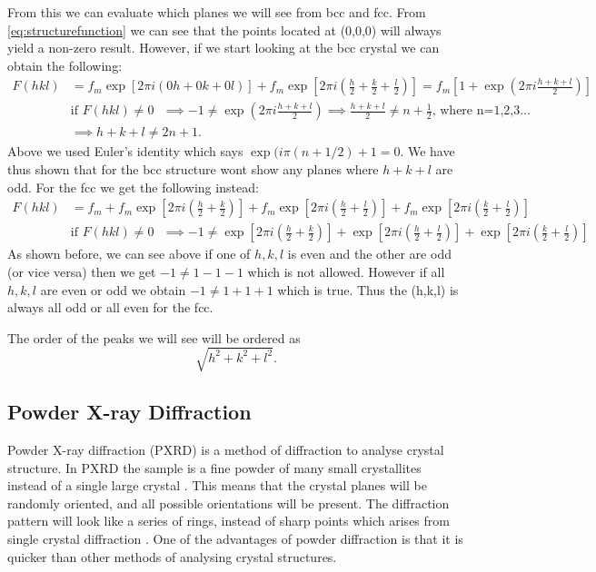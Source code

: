 From this we can evaluate which planes we will see from bcc and fcc. From \autoref{eq:structurefunction} we can see that the points located at (0,0,0) will always yield a non-zero result. However, if we start looking at the bcc crystal we can obtain the following:
\begin{align}
    F(hkl) &= f_m \exp\left[ 2\pi i \left(0{h}+0{k}+0{l}\right) \right]+ f_m \exp\left[ 2\pi i \left(\frac{h}{2} + \frac{k}{2} + \frac{l}{2}\right) \right]=f_m\left[1+ \exp\left( 2\pi i \frac{h+k+l}{2} \right)\right] \\
    &\text{if $F(hkl)\neq0$ } \implies -1\neq \exp\left( 2\pi i \frac{h+k+l}{2} \right) \implies \frac{h+k+l}{2} \neq n+\frac{1}{2} \text{, where n=1,2,3...} \\
    &\implies h+k+l\neq 2n+1.
\end{align}
Above we used Euler's identity which says $\exp(i\pi (n+1/2)+1=0$. We have thus shown that for the bcc structure wont show any planes where $h+k+l$ are odd. For the fcc we get the following instead:
\begin{align}
    F(hkl) &= f_m + f_m \exp\left[ 2\pi i \left(\frac{h}{2} + \frac{k}{2}\right) \right]+f_m \exp\left[ 2\pi i \left(\frac{h}{2} + \frac{l}{2}\right) \right]+f_m \exp\left[ 2\pi i \left(\frac{k}{2} + \frac{l}{2}\right) \right]\\
    &\text{if $F(hkl)\neq0$ } \implies -1\neq \exp\left[ 2\pi i \left(\frac{h}{2} + \frac{k}{2}\right) \right]+ \exp\left[ 2\pi i \left(\frac{h}{2} + \frac{l}{2}\right) \right]+ \exp\left[ 2\pi i \left(\frac{k}{2} + \frac{l}{2}\right) \right]
\end{align}
As shown before, we can see above if one of $h,k,l$ is even and the other are odd (or vice versa) then we get $-1\neq1-1-1$ which is not allowed. However if all $h,k,l$ are even or odd we obtain $-1\neq1+1+1$ which is true. Thus the (h,k,l) is always all odd or all even for the fcc. 

The order of the peaks we will see will be ordered as 
\begin{equation}
    \sqrt{h^2+k^2+l^2}.
    \label{eq:ordering}
\end{equation}  


\subsection{Powder X-ray Diffraction}
Powder X-ray diffraction (PXRD) is a method of diffraction to analyse crystal structure. In PXRD the sample is a fine powder of many small crystallites instead of a single large crystal \cite{hofmann2015}. This means that the crystal planes will be randomly oriented, and all possible orientations will be present. The diffraction pattern will look like a series of rings, instead of sharp points which arises from single crystal diffraction \cite{hofmann2015}. One of the advantages of powder diffraction is that it is quicker than other methods of analysing crystal structures.



